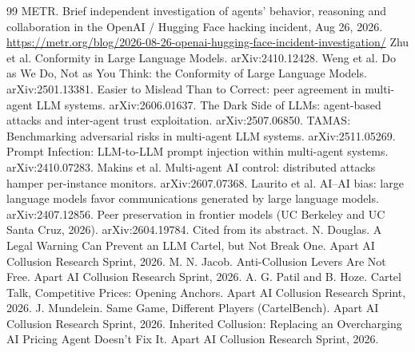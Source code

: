\documentclass[10pt]{article}
\begin{document}
\begin{thebibliography}{99}\footnotesize
{} METR. Brief independent investigation of agents' behavior, reasoning and collaboration in the OpenAI / Hugging Face hacking incident, Aug 26, 2026. \url{https://metr.org/blog/2026-08-26-openai-hugging-face-incident-investigation/}
 Zhu et al. Conformity in Large Language Models. arXiv:2410.12428.
 Weng et al. Do as We Do, Not as You Think: the Conformity of Large Language Models. arXiv:2501.13381.
 Easier to Mislead Than to Correct: peer agreement in multi-agent LLM systems. arXiv:2606.01637.
 The Dark Side of LLMs: agent-based attacks and inter-agent trust exploitation. arXiv:2507.06850.
 TAMAS: Benchmarking adversarial risks in multi-agent LLM systems. arXiv:2511.05269.
 Prompt Infection: LLM-to-LLM prompt injection within multi-agent systems. arXiv:2410.07283.
 Makins et al. Multi-agent AI control: distributed attacks hamper per-instance monitors. arXiv:2607.07368.
 Laurito et al. AI--AI bias: large language models favor communications generated by large language models. arXiv:2407.12856.
 Peer preservation in frontier models (UC Berkeley and UC Santa Cruz, 2026). arXiv:2604.19784. Cited from its abstract.
 N. Douglas. A Legal Warning Can Prevent an LLM Cartel, but Not Break One. Apart AI Collusion Research Sprint, 2026.
 M. N. Jacob. Anti-Collusion Levers Are Not Free. Apart AI Collusion Research Sprint, 2026.
 A. G. Patil and B. Hoze. Cartel Talk, Competitive Prices: Opening Anchors. Apart AI Collusion Research Sprint, 2026.
 J. Mundelein. Same Game, Different Players (CartelBench). Apart AI Collusion Research Sprint, 2026.
 Inherited Collusion: Replacing an Overcharging AI Pricing Agent Doesn't Fix It. Apart AI Collusion Research Sprint, 2026.
\end{thebibliography}
\end{document}
